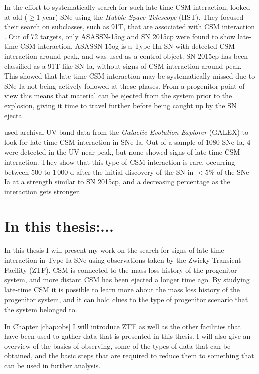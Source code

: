 \documentclass[a4paper,oneside,12pt, class=Latex/Classes/PhDthesisPSnPDF, crop=false]{standalone}
\begin{document}
In the effort to systematically search for such late-time CSM interaction, \citet{2015cp} looked at old ($\geq1$ year) SNe using the \textit{Hubble Space Telescope} (HST). They focused their search on subclasses, such as 91T, that are associated with CSM interaction \citep{Ia-CSM_and_91T_connection}. Out of 72 targets, only ASASSN-15og and SN 2015cp were found to show late-time CSM interaction. ASASSN-15og is a Type IIn SN with detected CSM interaction around peak, and was used as a control object. SN 2015cp has been classified as a 91T-like SN Ia, without signs of CSM interaction around peak. This showed that late-time CSM interaction may be systematically missed due to SNe Ia not being actively followed at these phases. From a progenitor point of view this means that material can be ejected from the system prior to the explosion, giving it time to travel further before being caught up by the SN ejecta.

\citet{GALEX_Late_CSM} used archival UV-band data from the \textit{Galactic Evolution Explorer} (GALEX) to look for late-time CSM interaction in SNe Ia. Out of a sample of 1080 SNe Ia, 4 were detected in the UV near peak, but none showed signs of late-time CSM interaction. They show that this type of CSM interaction is rare, occurring between 500 to $1\,000$ d after the initial discovery of the SN in $<5$\% of the SNe Ia at a strength similar to SN 2015cp, and a decreasing percentage as the interaction gets stronger.



\section{In this thesis:...}
In this thesis I will present my work on the search for signs of late-time interaction in Type Ia SNe using observations taken by the Zwicky Transient Facility (ZTF). CSM is connected to the mass loss history of the progenitor system, and more distant CSM has been ejected a longer time ago. By studying late-time CSM it is possible to learn more about the mass loss history of the progenitor system, and it can hold clues to the type of progenitor scenario that the system belonged to.

In Chapter \ref{chap:obs} I will introduce ZTF as well as the other facilities that have been used to gather data that is presented in this thesis. I will also give an overview of the basics of observing, some of the types of data that can be obtained, and the basic steps that are required to reduce them to something that can be used in further analysis.
\end{document}
